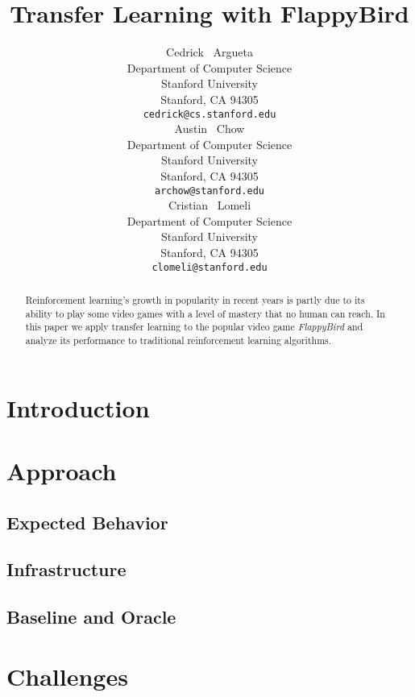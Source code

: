 \documentclass{article}
\title{Transfer Learning with FlappyBird}
\author{
  Cedrick ~Argueta \\%
  Department of Computer Science\\
  Stanford University\\
  Stanford, CA 94305 \\
  \texttt{cedrick@cs.stanford.edu} \\
  \And
  Austin ~Chow \\
  Department of Computer Science \\
  Stanford University\\
  Stanford, CA 94305 \\
  \texttt{archow@stanford.edu} \\
  \AND
  Cristian ~Lomeli\\
  Department of Computer Science \\
  Stanford University\\
  Stanford, CA 94305 \\
  \texttt{clomeli@stanford.edu} \\
}
\begin{document}

\maketitle

\begin{abstract}

Reinforcement learning's growth in popularity in recent years is partly due to its ability to play some video games with a level of mastery that no human can reach. In this paper we apply transfer learning to the popular video game \textit{FlappyBird} and analyze its performance to traditional reinforcement learning algorithms.
 
\end{abstract}

\section{Introduction}

\section{Approach}

\subsection{Expected Behavior}

\subsection{Infrastructure}

\subsection{Baseline and Oracle}

\section{Challenges}
\end{document}
